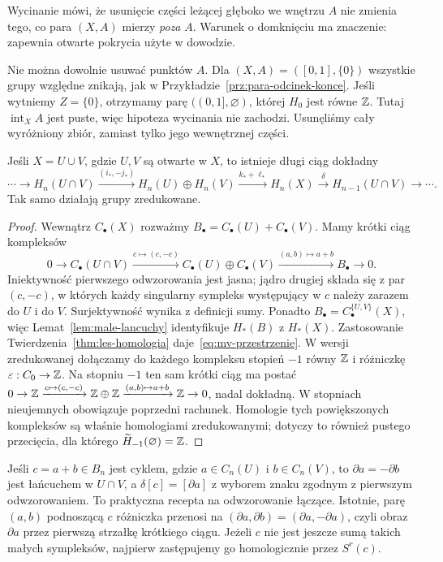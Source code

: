 Wycinanie mówi, że usunięcie części
leżącej głęboko we wnętrzu $A$
nie zmienia tego, co para $(X,A)$
mierzy \emph{poza} $A$. Warunek
o domknięciu ma znaczenie:
zapewnia otwarte pokrycia użyte
w dowodzie.

Nie można dowolnie usuwać punktów $A$. Dla
$(X,A)=([0,1],\{0\})$ wszystkie grupy względne znikają,
jak w Przykładzie~\ref{prz:para-odcinek-konce}.
Jeśli wytniemy $Z=\{0\}$, otrzymamy parę $((0,1],\varnothing)$,
której $H_0$ jest równe $\mathbb{Z}$. Tutaj $\operatorname{int}_X A$
jest puste, więc hipoteza wycinania nie zachodzi.
Usunęliśmy cały wyróżniony zbiór, zamiast tylko jego wewnętrznej części.

\begin{twierdzenie}
\label{thm:mv-przestrzenie}
Jeśli $X=U\cup V$, gdzie $U,V$
są otwarte w $X$, to istnieje
długi ciąg dokładny
\begin{equation}\label{eq:mv-przestrzenie}
 \cdots\to H_n(U\cap V)
 \xrightarrow{(i_*,-j_*)}
 H_n(U)\oplus H_n(V)
 \xrightarrow{k_*+\ell_*}H_n(X)
 \xrightarrow{\delta}H_{n-1}(U\cap V)\to\cdots.
\end{equation}
Tak samo działają grupy zredukowane.
\end{twierdzenie}
\begin{proof}
Wewnątrz $C_\bullet(X)$ rozważmy
$B_\bullet=C_\bullet(U)+C_\bullet(V)$.
Mamy krótki ciąg kompleksów
\[
 0\to C_\bullet(U\cap V)
 \xrightarrow{c\mapsto(c,-c)}
 C_\bullet(U)\oplus C_\bullet(V)
 \xrightarrow{(a,b)\mapsto a+b}
 B_\bullet\to0.
\]
Iniektywność pierwszego odwzorowania jest jasna;
jądro drugiej składa się z par
$(c,-c)$, w których każdy singularny
sympleks występujący w $c$ należy
zarazem do $U$ i do $V$.
Surjektywność wynika z definicji sumy.
Ponadto $B_\bullet=C_\bullet^{\{U,V\}}(X)$,
więc Lemat~\ref{lem:male-lancuchy}
identyfikuje $H_*(B)$ z $H_*(X)$.
Zastosowanie Twierdzenia~\ref{thm:les-homologia}
daje~\eqref{eq:mv-przestrzenie}.
W wersji zredukowanej dołączamy
do każdego kompleksu stopień $-1$
równy $\mathbb{Z}$ i różniczkę
$\varepsilon:C_0\to\mathbb{Z}$.
Na stopniu $-1$ ten sam krótki
ciąg ma postać
$0\to\mathbb{Z}\xrightarrow{c\mapsto(c,-c)}
\mathbb{Z}\oplus\mathbb{Z}\xrightarrow{(a,b)\mapsto a+b}
\mathbb{Z}\to0$, nadal dokładną.
W stopniach nieujemnych
obowiązuje poprzedni rachunek.
Homologie tych powiększonych
kompleksów są właśnie
homologiami zredukowanymi;
dotyczy to również pustego
przecięcia, dla którego
$\widetilde H_{-1}(\varnothing)=\mathbb{Z}$.
\end{proof}

Jeśli $c=a+b\in B_n$ jest cyklem,
gdzie $a\in C_n(U)$ i $b\in C_n(V)$,
to $\partial a=-\partial b$ jest
łańcuchem w $U\cap V$, a
$\delta[c]=[\partial a]$ z wyborem
znaku zgodnym z pierwszym odwzorowaniem.
To praktyczna recepta na odwzorowanie łączące.
Istotnie, parę $(a,b)$ podnoszącą $c$ różniczka przenosi
na $(\partial a,\partial b)=(\partial a,-\partial a)$,
czyli obraz $\partial a$ przez pierwszą strzałkę krótkiego ciągu.
Jeżeli $c$ nie jest jeszcze sumą takich małych sympleksów,
najpierw zastępujemy go homologicznie przez $S^r(c)$.

